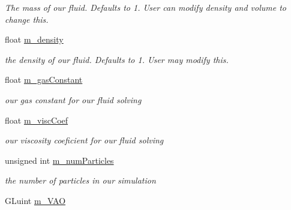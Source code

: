 \begin{DoxyCompactItemize}
\begin{DoxyCompactList}\small\item\em The mass of our fluid.  Defaults to 1. User can modify density and volume to change this. \end{DoxyCompactList}\item 
\hypertarget{class_s_p_h_engine_abd4a680dc909727e3026e7c3387bc3a8}{float \hyperlink{class_s_p_h_engine_abd4a680dc909727e3026e7c3387bc3a8}{m\-\_\-density}}\label{class_s_p_h_engine_abd4a680dc909727e3026e7c3387bc3a8}

\begin{DoxyCompactList}\small\item\em the density of our fluid.  Defaults to 1. User may modify this. \end{DoxyCompactList}\item 
\hypertarget{class_s_p_h_engine_ae85b89c5347bb6c5c1097e3f0d16d2b5}{float \hyperlink{class_s_p_h_engine_ae85b89c5347bb6c5c1097e3f0d16d2b5}{m\-\_\-gas\-Constant}}\label{class_s_p_h_engine_ae85b89c5347bb6c5c1097e3f0d16d2b5}

\begin{DoxyCompactList}\small\item\em our gas constant for our fluid solving \end{DoxyCompactList}\item 
\hypertarget{class_s_p_h_engine_a277d7add22691d816b05198c53bb94ab}{float \hyperlink{class_s_p_h_engine_a277d7add22691d816b05198c53bb94ab}{m\-\_\-visc\-Coef}}\label{class_s_p_h_engine_a277d7add22691d816b05198c53bb94ab}

\begin{DoxyCompactList}\small\item\em our viscosity coeficient for our fluid solving \end{DoxyCompactList}\item 
\hypertarget{class_s_p_h_engine_a1b1e56bc8e188a5c85bbadb9d3ff0d6b}{unsigned int \hyperlink{class_s_p_h_engine_a1b1e56bc8e188a5c85bbadb9d3ff0d6b}{m\-\_\-num\-Particles}}\label{class_s_p_h_engine_a1b1e56bc8e188a5c85bbadb9d3ff0d6b}

\begin{DoxyCompactList}\small\item\em the number of particles in our simulation \end{DoxyCompactList}\item 
\hypertarget{class_s_p_h_engine_af7bb756facfeba1f59c195c680794fc1}{G\-Luint \hyperlink{class_s_p_h_engine_af7bb756facfeba1f59c195c680794fc1}{m\-\_\-\-V\-A\-O}}\label{class_s_p_h_engine_af7bb756facfeba1f59c195c680794fc1}


\end{DoxyCompactItemize}
